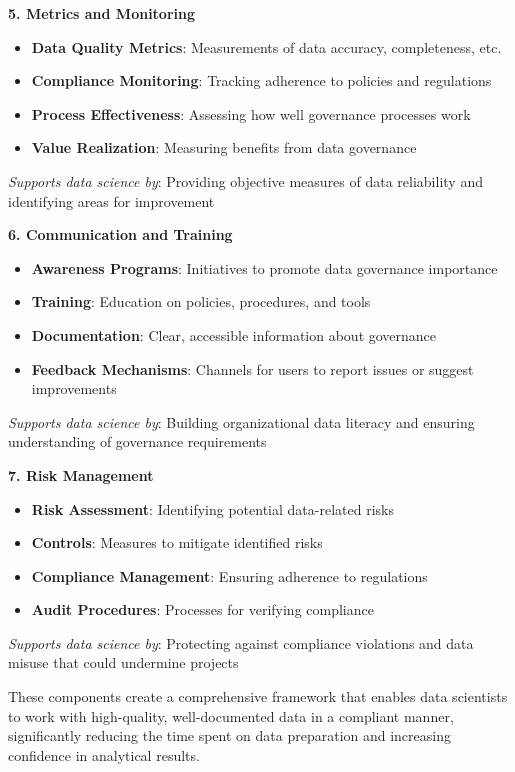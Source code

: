 \documentclass[12pt]{article}
\begin{document}
\begin{enumerate}
\begin{tcolorbox}[colback=blue!5!white,colframe=blue!75!black,title={Solution}]
    \textbf{5. Metrics and Monitoring}
    \begin{itemize}
        \item \textbf{Data Quality Metrics}: Measurements of data accuracy, completeness, etc.
        \item \textbf{Compliance Monitoring}: Tracking adherence to policies and regulations
        \item \textbf{Process Effectiveness}: Assessing how well governance processes work
        \item \textbf{Value Realization}: Measuring benefits from data governance
    \end{itemize}
    \textit{Supports data science by}: Providing objective measures of data reliability and identifying areas for improvement
    
    \textbf{6. Communication and Training}
    \begin{itemize}
        \item \textbf{Awareness Programs}: Initiatives to promote data governance importance
        \item \textbf{Training}: Education on policies, procedures, and tools
        \item \textbf{Documentation}: Clear, accessible information about governance
        \item \textbf{Feedback Mechanisms}: Channels for users to report issues or suggest improvements
    \end{itemize}
    \textit{Supports data science by}: Building organizational data literacy and ensuring understanding of governance requirements
    
    \textbf{7. Risk Management}
    \begin{itemize}
        \item \textbf{Risk Assessment}: Identifying potential data-related risks
        \item \textbf{Controls}: Measures to mitigate identified risks
        \item \textbf{Compliance Management}: Ensuring adherence to regulations
        \item \textbf{Audit Procedures}: Processes for verifying compliance
    \end{itemize}
    \textit{Supports data science by}: Protecting against compliance violations and data misuse that could undermine projects
    
    These components create a comprehensive framework that enables data scientists to work with high-quality, well-documented data in a compliant manner, significantly reducing the time spent on data preparation and increasing confidence in analytical results.
    \end{tcolorbox}
    

\end{enumerate}
\end{document}
